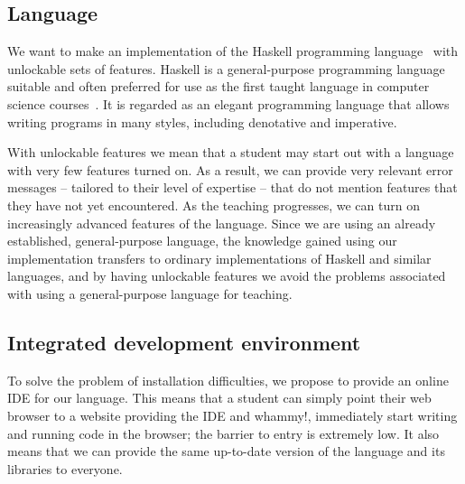 \subsection{Language} \label{sec:Language}

We want to make an implementation of the Haskell programming
language~\cite{marlow2010haskell} with unlockable sets of features.  Haskell is
a general-purpose programming language suitable and often preferred for use as 
the first taught language in computer science 
courses~\cite{dijkstra2001members}. It is regarded as an elegant programming 
language that allows writing programs in many styles, including denotative and 
imperative.

With unlockable features we mean that a student may start out with a language
with very few features turned on. As a result, we can provide very relevant
error messages -- tailored to their level of expertise -- that do not mention
features that they have not yet encountered. As the teaching progresses, we can
turn on increasingly advanced features of the language.  Since we are using an
already established, general-purpose language, the knowledge gained using our 
implementation transfers to ordinary implementations of Haskell and similar 
languages, and by having unlockable features we avoid the problems associated 
with using a general-purpose language for teaching.

\subsection{Integrated development environment} \label{sec:IDE}

To solve the problem of installation difficulties, we propose to provide an
online IDE for our language.  This means that a student can simply point their
web browser to a website providing the IDE and whammy!, immediately start 
writing and running code in the browser; the barrier to entry is extremely 
low. It also means that we can provide the same up-to-date version of the 
language and its libraries to everyone.

